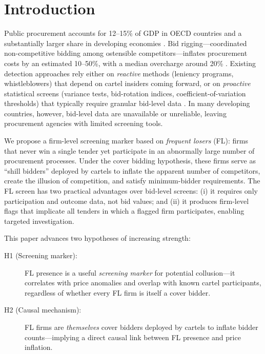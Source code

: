 \section{Introduction}
\label{sec:intro}

Public procurement accounts for 12--15\% of GDP in OECD countries and a
substantially larger share in developing economies
\citep{oecd2019government}. Bid rigging---coordinated non-competitive
bidding among ostensible competitors---inflates procurement costs by an
estimated 10--50\%, with a median overcharge around 20\%
\citep{connor2007price}. Existing detection approaches rely either on
\emph{reactive} methods (leniency programs, whistleblowers) that depend
on cartel insiders coming forward, or on \emph{proactive} statistical
screens (variance tests, bid-rotation indices, coefficient-of-variation
thresholds) that typically require granular bid-level data
\citep{harrington2008detecting, imhof2019detecting}. In many developing
countries, however, bid-level data are unavailable or unreliable, leaving
procurement agencies with limited screening tools.

We propose a firm-level screening marker based on
\emph{frequent losers} (FL): firms that never win a single tender yet
participate in an abnormally large number of procurement processes. Under
the cover bidding hypothesis, these firms serve as ``shill bidders''
deployed by cartels to inflate the apparent number of competitors, create
the illusion of competition, and satisfy minimum-bidder requirements. The
FL screen has two practical advantages over bid-level screens: (i) it
requires only participation and outcome data, not bid values; and (ii)
it produces firm-level flags that implicate all tenders in which a
flagged firm participates, enabling targeted investigation.

This paper advances two hypotheses of increasing strength:

\begin{description}
  \item[H1 (Screening marker):] FL presence is a useful
    \emph{screening marker} for potential collusion---it correlates
    with price anomalies and overlap with known cartel participants,
    regardless of whether every FL firm is itself a cover bidder.
  \item[H2 (Causal mechanism):] FL firms are \emph{themselves} cover
    bidders deployed by cartels to inflate bidder counts---implying a
    direct causal link between FL presence and price inflation.
\end{description}

